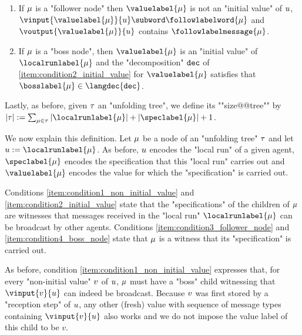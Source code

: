 \begin{definition}
\begin{enumerate}[label= (\roman*), ref=(\roman*)]
		\item \label{item:condition3_follower_node} If $\mu$ is a "follower node" then $\valuelabel{\node}$ is not an "initial value" of $u$, $\vinput{\valuelabel{\node}}{\localrun} \subword \followlabelword{\node}$ and 
		$\voutput{\valuelabel{\node}}{\localrun}$ contains $\followlabelmessage{\node}$.
		
		\item \label{item:condition4_boss_node} If $\mu$ is a "boss node", then $\valuelabel{\node}$ is an "initial value" of $\localrunlabel{\node}$ and the "decomposition" $\mathtt{dec}$ of \ref{item:condition2_initial_value} for $\valuelabel{\node}$ satisfies that $\bosslabel{\node} \in \langdec{\decsymb}$.
	\end{enumerate}
	
	\AP Lastly, as before, given $\tau$ an "unfolding tree", we define its ""size@@tree"" by $\size{\tree} := \sum_{\node \in \tree} \size{\localrunlabel{\node}} + \size{\speclabel{\node}} + 1$. %
\end{definition}

We now explain this definition. Let $\mu$ be a node of an "unfolding tree" $\tau$ and let $\localrun := \localrunlabel{\node}$. 
As before, $u$ encodes the "local run" of a given agent, $\speclabel{\node}$ encodes the specification that this "local run" carries out and $\valuelabel{\node}$ encodes the value for which the "specification" is carried out.

Conditions \ref{item:condition1_non_initial_value} and \ref{item:condition2_initial_value} state that the "specifications" of the children of $\mu$ are witnesses that messages received in the "local run" $\localrunlabel{\node}$ can be broadcast by other agents. 
Conditions \ref{item:condition3_follower_node} and \ref{item:condition4_boss_node} state that $\mu$ is a witness that its "specification" is carried out. 

As before, condition \ref{item:condition1_non_initial_value} expresses that, for every "non-initial value" $v$ of $u$, $\mu$ must have a "boss" child witnessing that $\vinput{v}{\localrun}$ can indeed be broadcast. 
Because $v$ was first stored by a "reception step" of $u$, any other (fresh) value with sequence of message types containing $\vinput{v}{\localrun}$ also works and we do not impose the value label of this child to be $v$. 

